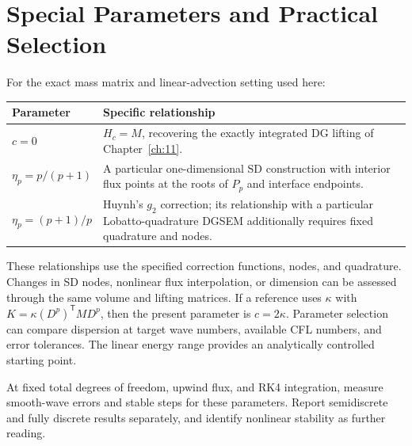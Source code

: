 \section{Special Parameters and Practical Selection}
For the exact mass matrix and linear-advection setting used here:
\begin{center}\small
\begin{tabularx}{\textwidth}{@{}l>{\raggedright\arraybackslash}X@{}}
\toprule
Parameter & Specific relationship\\
\midrule
$c=0$ & $H_c=M$, recovering the exactly integrated DG lifting of Chapter~\ref{ch:11}.\\
$\eta_p=p/(p+1)$ & A particular one-dimensional SD construction with interior flux points at the roots of $P_p$ and interface endpoints.\\
$\eta_p=(p+1)/p$ & Huynh's $g_2$ correction; its relationship with a particular Lobatto-quadrature DGSEM additionally requires fixed quadrature and nodes.\\
\bottomrule
\end{tabularx}
\end{center}
These relationships use the specified correction functions, nodes, and quadrature.
Changes in SD nodes, nonlinear flux interpolation, or dimension can be assessed through the same volume and lifting matrices.
If a reference uses $\kappa$ with $K=\kappa(D^p)^{\mathsf T}MD^p$,
then the present parameter is $c=2\kappa$.
Parameter selection can compare dispersion at target wave numbers, available CFL numbers, and error tolerances. The linear energy range provides an analytically controlled starting point.

{At fixed total degrees of freedom, upwind flux, and RK4 integration, measure smooth-wave errors and stable steps for these parameters. Report semidiscrete and fully discrete results separately, and identify nonlinear stability as further reading.}
